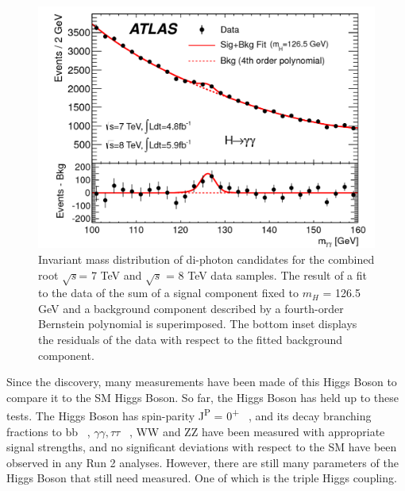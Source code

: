 \begin{figure}[h]
\begin{center}
\includegraphics[scale=0.35]{figures/higgs_disc}
\caption[Higgs boson mass peak]{Invariant mass distribution of di-photon candidates for the combined root $\sqrt{s}$= 7 TeV and $\sqrt{s}$ = 8 TeV data samples. The result of a fit to the data of the sum of a signal component fixed to $m_{H}$ = 126.5 GeV and a background component described by a fourth-order Bernstein polynomial is superimposed. The bottom inset displays the residuals of the data with respect to the fitted background component.}
\label{fig:Higgs}
\end{center}
\end{figure}

Since the discovery, many measurements have been made of this Higgs Boson to compare it to the SM Higgs Boson. So far, the Higgs Boson has held up to these tests. The Higgs Boson has spin-parity J\textsuperscript{P} = 0\textsuperscript{+} ~\cite{Aad:2013xqa}, and its decay branching fractions to bb ~\cite{Aaboud:2018zhk}, ${\gamma\gamma, \tau\tau}$ ~\cite{Aaboud:2018pen}, WW and ZZ have been measured with appropriate signal strengths, and no significant deviations with respect to the SM have been observed in any Run 2 analyses. However, there are still many parameters of the Higgs Boson that still need measured. One of which is the triple Higgs coupling.
